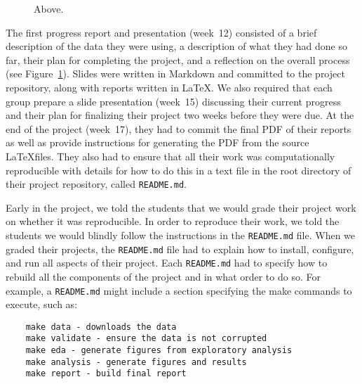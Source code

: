 \begin{figure}
\centering
\begin{tiny}

\end{tiny}
\caption{Above.}\label{fig:progress}
\end{figure}


The first progress report and presentation (week~12) consisted of a brief
description of the data they were using, a description of what they had done so
far, their plan for completing the project, and a reflection on the overall
process (see Figure~\ref{fig:progress}).
Slides were written in Markdown and committed to the project repository, along
with reports written in \LaTeX.
We also required that each group prepare a slide presentation (week~15)
discussing their current progress and their plan for finalizing their project two
weeks before they were due.
At the end of the project (week~17), they had to commit the final PDF of their
reports as well as provide instructions for generating the PDF from the source
\LaTeX files.
They also had to ensure that all their work was computationally reproducible
with details for how to do this in a text file in the root directory of
their project repository, called \texttt{README.md}.

Early in the project, we told the students that we would grade their project
work on whether it was reproducible.  In order to reproduce their work, we
told the students we would blindly follow the instructions in the
\texttt{README.md} file.
When we graded their projects, the \texttt{README.md} file had to explain how
to install, configure, and run all aspects of their project.
Each \texttt{README.md} had to specify how to rebuild all the components of
the project and in what order to do so.
For example, a \texttt{README.md} might include a section specifying
the make commands to execute, such as:
\begin{verbatim}
    make data - downloads the data 
    make validate - ensure the data is not corrupted
    make eda - generate figures from exploratory analysis
    make analysis - generate figures and results
    make report - build final report
\end{verbatim}


